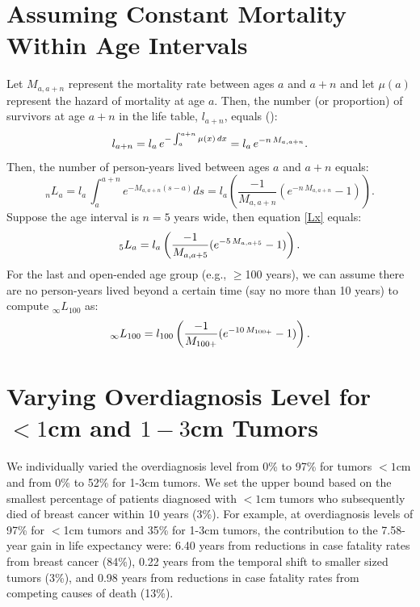 \documentclass[11pt,letterpaper]{article}
\theoremstyle{plain}
\theoremstyle{remark}
\numberwithin{equation}{section}
\begin{document}
\section{Assuming Constant Mortality Within Age Intervals}
Let $M_{a,a+n}$ represent the mortality rate between ages $a$ and
$a+n$ and let $\mu(a)$ represent the hazard of mortality at age
$a$. Then, the number (or proportion) of survivors at age $a+n$ in the
life table, $l_{a+n}$, equals (\cite{PreHeuGui00}):
\begin{equation}
l_{a+n}=l_{a}\,e^{-\int_a^{a+n}\mu(x)\,dx}=l_{a}\,e^{-n\,M_{a,a+n}}.\notag
\end{equation}
Then, the number of person-years lived between ages $a$ and $a+n$ equals:
\begin{equation}
_nL_{a}=l_a\,\int_a^{a+n} e^{-M_{a,a+n}(s-a)} ds=l_a \left(\frac{-1}{M_{a,a+n}}(e^{-n\,M_{a,a+n}}-1) \right).
\label{Lx}
\end{equation}
Suppose the age interval is $n=5$ years wide, then equation \eqref{Lx}
equals:
\begin{equation}
_5L_{a}=l_a \left(\frac{-1}{M_{a,a+5}}(e^{-5\,M_{a,a+5}}-1) \right).\notag
\end{equation}
For the last and open-ended age group (e.g., $\geq$100 years), we can assume there
are no person-years lived beyond a certain time (say no more than 10
years) to compute $_{\infty}L_{100}$ as:
\begin{equation}
_{\infty}L_{100}=l_{100} \left(\frac{-1}{M_{100+}}(e^{-10\,M_{100+}}-1) \right).\notag
\end{equation}


\newpage
\section{Varying Overdiagnosis Level for $<1$cm and $1-3$cm Tumors}
We individually varied the overdiagnosis level from 0\% to 97\% for
tumors $<1$cm and from 0\% to 52\% for 1-3cm tumors.  We set the upper
bound based on the smallest percentage of patients diagnosed with $<1$cm
tumors who subsequently died of breast cancer within 10 years (3\%).
For example, at overdiagnosis levels of 97\% for $<$1cm tumors and
35\% for 1-3cm tumors, the contribution to the 7.58-year gain in life
expectancy were: 6.40 years from reductions in case fatality rates
from breast cancer (84\%), 0.22 years from the temporal shift to
smaller sized tumors (3\%), and 0.98 years from reductions in case
fatality rates from competing causes of death (13\%).
\end{document}
